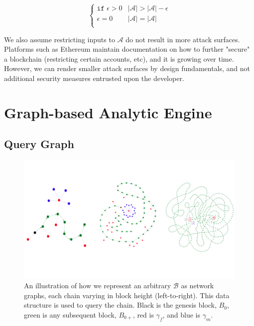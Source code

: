 \documentclass[12pt, titlepage, twocolumn]{report}
\begin{document}
\begin{equation}
	\begin{cases} 
      	\texttt{if } \epsilon > 0 &  \vert\mathcal{A}\vert > \vert\mathcal{A}\vert - \epsilon \\
      	\epsilon = 0   &  \vert\mathcal{A}\vert = \vert\mathcal{A}\vert \\
   	\end{cases}
\end{equation}

We also assume restricting inputs to \(\mathcal{A}\) do not result in more attack surfaces. Platforms such as Ethereum maintain documentation on how to further "secure" a blockchain (restricting certain accounts, etc), and it is growing over time. However, we can render smaller attack surfaces by design fundamentals, and not additional security measures entrusted upon the developer.

\chapter{Graph-based Analytic Engine}

\section{Query Graph}


\begin{figure}[ht]
\centering
	\includegraphics[width=\textwidth]{3_networks}
	\caption{An illustration of how we represent an arbitrary \( \boldsymbol{\mathcal{B}} \) as network graphs, each chain varying in block height (left-to-right). This data structure is used to query the chain. Black is the genesis block, \(B_0\), green is any subsequent block, \(B_{0+}\), red is \(\gamma_f\), and blue is \(\gamma_m\). }
	\label{3_networks}
\end{figure}
\end{document}
